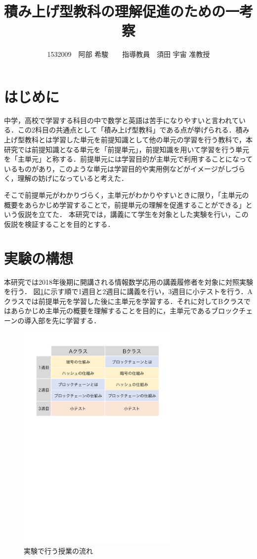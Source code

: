 \documentclass[twocolumn,10pt,a4j]{jsarticle}
\title{積み上げ型教科の理解促進のための一考察}
\author{1532009　阿部 希駿　　指導教員　須田 宇宙 准教授}
\date{}
\begin{document}
\maketitle

\section{はじめに}

中学，高校で学習する科目の中で数学と英語は苦手になりやすいと言われている\cite{1}．この2科目の共通点として「積み上げ型教科」である点が挙げられる．積み上げ型教科とは学習した単元を前提知識として他の単元の学習を行う教科で，本研究では前提知識となる単元を「前提単元」，前提知識を用いて学習を行う単元を「主単元」と称する．前提単元には学習目的が主単元で利用することになっているものがあり，このような単元は学習目的や実用例などがイメージがしづらく，理解の妨げになっていると考えた．

そこで前提単元がわかりづらく，主単元がわかりやすいときに限り，「主単元の概要をあらかじめ学習することで，前提単元の理解を促進することができる」という仮説を立てた．
本研究では，講義にて学生を対象とした実験を行い，この仮説を検証することを目的とする．



\section{実験の構想}

本研究では2018年後期に開講される情報数学応用の講義履修者を対象に対照実験を行う．
図\ref{fig:time}に示す順で1週目と2週目に講義を行い，3週目に小テストを行う．Aクラスでは前提単元を学習した後に主単元を学習する．それに対してBクラスではあらかじめ主単元の概要を理解することを目的に，主単元であるブロックチェーンの導入部を先に学習する．

\begin{figure}[H]
\centering
\includegraphics[mediaboxonly=/CropBox,width=8cm]{timeline.pdf}
\caption{実験で行う授業の流れ}
\label{fig:time}
\end{figure}
\end{document}
